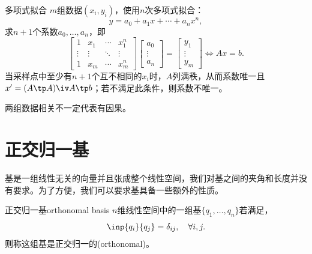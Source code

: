 \begin{example}{多项式拟合}{}
	$m$组数据$(x_i,y_i)$，使用$n$次多项式拟合：
	\[
		y=a_0+a_1x+\cdots+a_nx^n,
	\]
	求$n+1$个系数$a_0,\ldots,a_n$，即 
	\[
		\begin{bmatrix}
			1&x_1&\cdots&x_1^n\\\vdots&\vdots&\ddots&\vdots\\1&x_m&\cdots&x_m^n
		\end{bmatrix}
		\begin{bmatrix}
			a_0\\\vdots\\a_n
		\end{bmatrix}=
		\begin{bmatrix}
			y_1\\\vdots\\y_m
		\end{bmatrix}\iff Ax=b.
	\]
	当采样点中至少有$n+1$个互不相同的$x_i$时，$A$列满秩，从而系数唯一且$x'=(A\tp A)\iv A\tp b$；若不满足此条件，则系数不唯一。
\end{example}

\begin{remark}
	两组数据相关不一定代表有因果。
\end{remark}

\section{正交归一基}

基是一组线性无关的向量并且张成整个线性空间，我们对基之间的夹角和长度并没有要求。为了方便，我们可以要求基具备一些额外的性质。
\begin{definition}{正交归一基}{orthonomal basis}
	$n$维线性空间中的一组基$\{q_1,\ldots,q_n\}$若满足， 
	\[
		\inp{q_i}{q_j}=\delta_{ij},\quad\forall i,j.
	\]
	则称这组基是正交归一的(orthonomal)。
\end{definition}

